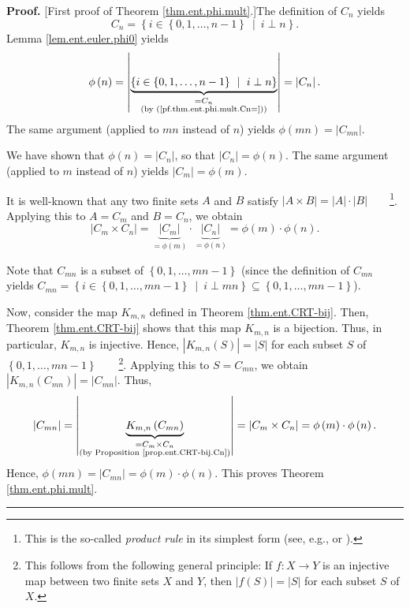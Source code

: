 \documentclass[numbers=enddot,12pt,final,onecolumn,notitlepage]{scrartcl}%
\numberwithin{exer}{subsection}
\theoremstyle{definition}
\newenvironment{proof}[1][Proof]{\noindent\textbf{#1.} }{\ \rule{0.5em}{0.5em}}
\begin{document}
\begin{proof}
[First proof of Theorem \ref{thm.ent.phi.mult}.]The definition of $C_{n}$
yields
\begin{equation}
C_{n}=\left\{  i\in\left\{  0,1,\ldots,n-1\right\}  \ \mid\ i\perp n\right\}
. \label{pf.thm.ent.phi.mult.Cn=}%
\end{equation}
Lemma \ref{lem.ent.euler.phi0} yields%
\[
\phi\left(  n\right)  =\left\vert \underbrace{\left\{  i\in\left\{
0,1,\ldots,n-1\right\}  \ \mid\ i\perp n\right\}  }_{\substack{=C_{n}%
\\\text{(by (\ref{pf.thm.ent.phi.mult.Cn=}))}}}\right\vert =\left\vert
C_{n}\right\vert .
\]
The same argument (applied to $mn$ instead of $n$) yields $\phi\left(
mn\right)  =\left\vert C_{mn}\right\vert $.

We have shown that $\phi\left(  n\right)  =\left\vert C_{n}\right\vert $, so
that $\left\vert C_{n}\right\vert =\phi\left(  n\right)  $. The same argument
(applied to $m$ instead of $n$) yields $\left\vert C_{m}\right\vert
=\phi\left(  m\right)  $.

It is well-known that any two finite sets $A$ and $B$ satisfy $\left\vert
A\times B\right\vert =\left\vert A\right\vert \cdot\left\vert B\right\vert
$\ \ \ \ \footnote{This is the so-called \textit{product rule} in its simplest
form (see, e.g., \cite[1.5]{Loehr-BC} or \cite[\S 15.2.1]{LeLeMe}).}. Applying
this to $A=C_{m}$ and $B=C_{n}$, we obtain%
\[
\left\vert C_{m}\times C_{n}\right\vert =\underbrace{\left\vert C_{m}%
\right\vert }_{=\phi\left(  m\right)  }\cdot\underbrace{\left\vert
C_{n}\right\vert }_{=\phi\left(  n\right)  }=\phi\left(  m\right)  \cdot
\phi\left(  n\right)  .
\]


Note that $C_{mn}$ is a subset of $\left\{  0,1,\ldots,mn-1\right\}  $ (since
the definition of $C_{mn}$ yields $C_{mn}=\left\{  i\in\left\{  0,1,\ldots
,mn-1\right\}  \ \mid\ i\perp mn\right\}  \subseteq\left\{  0,1,\ldots
,mn-1\right\}  $).

Now, consider the map $K_{m,n}$ defined in Theorem \ref{thm.ent.CRT-bij}.
Then, Theorem \ref{thm.ent.CRT-bij} shows that this map $K_{m,n}$ is a
bijection. Thus, in particular, $K_{m,n}$ is injective. Hence, $\left\vert
K_{m,n}\left(  S\right)  \right\vert =\left\vert S\right\vert $ for each
subset $S$ of $\left\{  0,1,\ldots,mn-1\right\}  $\ \ \ \ \footnote{This
follows from the following general principle: If $f:X\rightarrow Y$ is an
injective map between two finite sets $X$ and $Y$, then $\left\vert f\left(
S\right)  \right\vert =\left\vert S\right\vert $ for each subset $S$ of $X$.}.
Applying this to $S=C_{mn}$, we obtain $\left\vert K_{m,n}\left(
C_{mn}\right)  \right\vert =\left\vert C_{mn}\right\vert $. Thus,%
\[
\left\vert C_{mn}\right\vert =\left\vert \underbrace{K_{m,n}\left(
C_{mn}\right)  }_{\substack{=C_{m}\times C_{n}\\\text{(by Proposition
\ref{prop.ent.CRT-bij.Cn})}}}\right\vert =\left\vert C_{m}\times
C_{n}\right\vert =\phi\left(  m\right)  \cdot\phi\left(  n\right)  .
\]
Hence, $\phi\left(  mn\right)  =\left\vert C_{mn}\right\vert =\phi\left(
m\right)  \cdot\phi\left(  n\right)  $. This proves Theorem
\ref{thm.ent.phi.mult}.
\end{proof}
\end{document}
